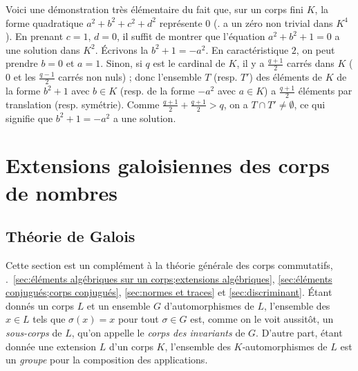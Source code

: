 \documentclass[11pt, useosf,
  title in boldface,
  theorem in new line,
  theorem numbering = section,
  number theorems separately,
]{simplivre}
\begin{document}
    \smallskip
    \begin{remark}
        Voici une démonstration très élémentaire du fait que, sur un corps fini \( K \), la forme quadratique \( a^2+b^2+c^2+d^2 \) représente \( 0 \) (\ie. a un zéro non trivial dans \( K^4 \)). En prenant \( c = 1 \), \( d = 0 \), il suffit de montrer que l'équation \( a^2+b^2+1 = 0 \) a une solution dans \( K^2 \). Écrivons la \( b^2+1 = -a^2 \). En caractéristique \( 2 \), on peut prendre \( b = 0 \) et \( a = 1 \). Sinon, si \( q \) est le cardinal de \( K \), il y a \( \frac{q+1}{2} \) carrés dans \( K \) (\( 0 \) et les \( \frac{q-1}{2} \) carrés non nuls) ; donc l'ensemble \( T \) (resp. \( T' \)) des éléments de \( K \) de la forme \( b^2+1 \) avec \( b \in K \) (resp. de la forme \( -a^2 \) avec \( a \in K \)) a \( \frac{q+1}{2} \) éléments par translation (resp. symétrie). Comme \( \frac{q+1}{2} + \frac{q+1}{2} > q \), on a \( T \cap T' \neq \emptyset \), ce qui signifie que \( b^2+1 = -a^2 \) a une solution.
        \pushQED{\qed}\qedhere
    \end{remark}


\chapter{Extensions galoisiennes des corps de nombres}

\section{Théorie de Galois}

    Cette section est un complément à la théorie générale des corps commutatifs, \cf.~\cref{sec:éléments algébriques sur un corps;extensions algébriques}, \cref{sec:éléments conjugués;corps conjugués}, \cref{sec:normes et traces} et \cref{sec:discriminant}. Étant donnés un corps \( L \) et un ensemble \( G \) d'automorphismes de \( L \), l'ensemble des \( x \in L \) tels que \( \sigma(x) = x \) pour tout \( \sigma \in G \) est, comme on le voit aussitôt, un \emph{sous-corps} de \( L \), qu'on appelle le \emph{corps des invariants} de \( G \). D'autre part, étant donnée une extension \( L \) d'un corps \( K \), l'ensemble des \( K \)‑automorphismes de \( L \) est un \emph{groupe} pour la composition des applications.
\end{document}

